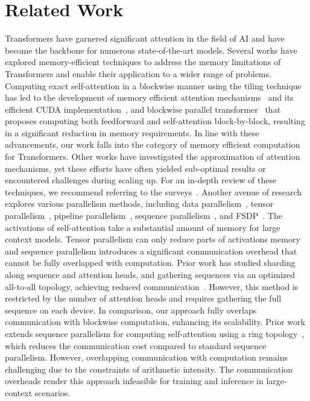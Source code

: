 \documentclass{article}
\begin{document}
\section{Related Work}
Transformers have garnered significant attention in the field of AI and have become the backbone for numerous state-of-the-art models. Several works have explored memory-efficient techniques to address the memory limitations of Transformers and enable their application to a wider range of problems.
Computing exact self-attention in a blockwise manner using the tiling technique~\citep{milakov2018online} has led to the development of memory efficient attention mechanisms~\citep{rabe2021self} and its efficient CUDA implementation~\citep{dao2022flashattention}, and blockwise parallel transformer~\citep{liu2023blockwise} that proposes computing both feedforward and self-attention block-by-block, resulting in a significant reduction in memory requirements.
In line with these advancements, our work falls into the category of memory efficient computation for Transformers.
Other works have investigated the approximation of attention mechanisms, yet these efforts have often yielded sub-optimal results or encountered challenges during scaling up. For an in-depth review of these techniques, we recommend referring to the surveys~\citep{narang2021transformer, tay2022scaling}.
Another avenue of research explores various parallelism methods, including data parallelism~\citep{dean2012large}, tensor parallelism~\citep{shoeybi2019megatron}, pipeline parallelism~\citep{narayanan2019pipedream,huang2019gpipe, narayanan2021memory},
sequence parallelism~\citep{li2021sequence, korthikanti2022reducing,jacobs2023deepspeed}, and FSDP~\citep{fbFullySharded, rajbhandari2020zero}.
The activations of self-attention take a substantial amount of memory for large context models. Tensor parallelism can only reduce parts of activations memory and sequence parallelism introduces a significant communication overhead that cannot be fully overlapped with computation.
Prior work has studied sharding along sequence and attention heads, and gathering sequences via an optimized all-to-all topology, achieving reduced communication~\citep{jacobs2023deepspeed}. However, this method is restricted by the number of attention heads and requires gathering the full sequence on each device. In comparison, our approach fully overlaps communication with blockwise computation, enhancing its scalability.
Prior work extends sequence parallelism for computing self-attention using a ring topology~\citep{li2021sequence}, which reduces the communication cost compared to standard sequence parallelism. However, overlapping communication with computation remains challenging due to the constraints of arithmetic intensity. The communication overheads render this approach infeasible for training and inference in large-context scenarios.
\end{document}
